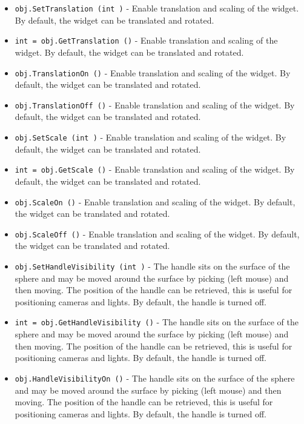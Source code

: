 \begin{itemize}
\item  \verb|obj.SetTranslation (int )| -  Enable translation and scaling of the widget. By default, the widget
 can be translated and rotated.

\item  \verb|int = obj.GetTranslation ()| -  Enable translation and scaling of the widget. By default, the widget
 can be translated and rotated.

\item  \verb|obj.TranslationOn ()| -  Enable translation and scaling of the widget. By default, the widget
 can be translated and rotated.

\item  \verb|obj.TranslationOff ()| -  Enable translation and scaling of the widget. By default, the widget
 can be translated and rotated.

\item  \verb|obj.SetScale (int )| -  Enable translation and scaling of the widget. By default, the widget
 can be translated and rotated.

\item  \verb|int = obj.GetScale ()| -  Enable translation and scaling of the widget. By default, the widget
 can be translated and rotated.

\item  \verb|obj.ScaleOn ()| -  Enable translation and scaling of the widget. By default, the widget
 can be translated and rotated.

\item  \verb|obj.ScaleOff ()| -  Enable translation and scaling of the widget. By default, the widget
 can be translated and rotated.

\item  \verb|obj.SetHandleVisibility (int )| -  The handle sits on the surface of the sphere and may be moved around
 the surface by picking (left mouse) and then moving. The position
 of the handle can be retrieved, this is useful for positioning cameras
 and lights. By default, the handle is turned off.

\item  \verb|int = obj.GetHandleVisibility ()| -  The handle sits on the surface of the sphere and may be moved around
 the surface by picking (left mouse) and then moving. The position
 of the handle can be retrieved, this is useful for positioning cameras
 and lights. By default, the handle is turned off.

\item  \verb|obj.HandleVisibilityOn ()| -  The handle sits on the surface of the sphere and may be moved around
 the surface by picking (left mouse) and then moving. The position
 of the handle can be retrieved, this is useful for positioning cameras
 and lights. By default, the handle is turned off.


\end{itemize}
